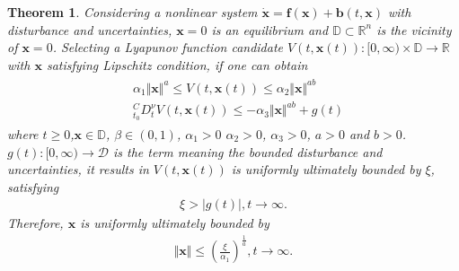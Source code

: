 \documentclass[ShortAfour]{sage}
\theoremstyle{plain}
\newtheorem{mythm}{Theorem}
\theoremstyle{remark}
\begin{document}
\begin{mythm}\label{theorem:fo UUB}
  Considering a nonlinear system $\dot{\bm x}=\bm f(\bm x)+\bm b(t,\bm x)$ with disturbance and uncertainties, $\bm x=0$ is an equilibrium and $\mathbb D\subset \mathbb R^n$ is the vicinity of $\bm x=0$. Selecting a  Lyapunov function candidate $V(t,\bm x(t)):[0,\infty)\times\mathbb D\to \mathbb R$ with $\bm x$ satisfying Lipschitz condition, if one can obtain
  \begin{align}
    \begin{split}\label{eq:ML UUB}
    &\alpha_1\Vert\bm x\Vert^a\le V(t,\bm x(t))\le\alpha_2\Vert\bm x\Vert^{ab}\\
     &^C_{t_0}D_t^\nu V(t,\bm x(t))\le-\alpha_3\Vert\bm x\Vert^{ab}+g(t)
  \end{split}
  \end{align}
  where $t\ge 0$,$\bm x\in \mathbb D$, $\beta\in(0,1)$, $\alpha_1>0$ $\alpha_2>0$, $\alpha_3>0$, $a>0$ and $b>0$. $g(t):[0,\infty)\to \mathcal D$ is the term meaning the bounded disturbance and uncertainties, it results in $V(t,\bm x(t))$ is uniformly ultimately bounded by $\xi$, satisfying
  \begin{align*}
      \xi>\vert g(t)\vert,t\to\infty.
  \end{align*}
  Therefore, $\bm x$ is uniformly ultimately bounded by
  \begin{align*}
      \Vert\bm x\Vert\le \left(\frac{\xi}{\alpha_1}\right)^{\frac{1}{a}},t\to\infty.
  \end{align*}
\end{mythm}
\end{document}

